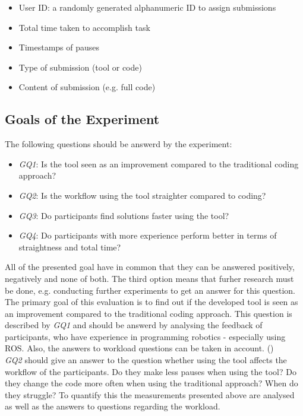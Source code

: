 \begin{itemize}
    \item User ID: a randomly generated alphanumeric ID to assign submissions
    \item Total time taken to accomplish task
    \item Timestamps of pauses
    \item Type of submission (tool or code)
    \item Content of submission (e.g. full code)
\end{itemize}

\subsection{Goals of the Experiment} \label{sub:ExperimentGoals}
The following questions should be answerd by the experiment:
\begin{itemize}
    \item \textit{GQ1}: Is the tool seen as an improvement compared to the traditional coding approach?
    \item \textit{GQ2}: Is the workflow using the tool straighter compared to coding?
    \item \textit{GQ3}: Do participants find solutions faster using the tool?
    \item \textit{GQ4}: Do participants with more experience perform better in terms of straightness and total time?
\end{itemize}
All of the presented goal have in common that they can be answered positively, negatively and none of both. The third option means that furher research must be done, e.g. conducting further experiments to get an answer for this question. \\

The primary goal of this evaluation is to find out if the developed tool is seen as an improvement compared to the traditional coding approach. This question is described by \textit{GQ1} and should be answerd by analysing the feedback of participants, who have experience in programming robotics - especially using ROS. Also, the answers to workload questions can be taken in account. () \\

\textit{GQ2} should give an answer to the question whether using the tool affects the workflow of the participants. Do they make less pauses when using the tool? Do they change the code more often when using the traditional approach? When do they struggle? To quantify this the measurements presented above are analysed as well as the answers to questions regarding the workload. \\

